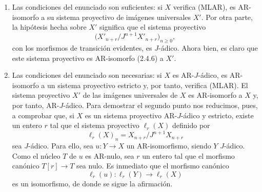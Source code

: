 \begin{prooftext}[Demostración]
\begin{enumerate}[label=(\alph*)]
\item Las condiciones del enunciado son suficientes: si $X$ verifica (MLAR), es AR-isomorfo a su sistema proyectivo de imágenes universales $X'$. Por otra parte, la hipótesis hecha sobre $X'$ significa que el sistema proyectivo
\[
\bigl(X'_{n+r}/J^{n+1}X'_{n+r}\bigr)_{n\ge0},
\]
con los morfismos de transición evidentes, es $J$-ádico. Ahora bien, es claro que este sistema proyectivo es AR-isomorfo (2.4.6) a $X'$.
\item Las condiciones del enunciado son necesarias: si $X$ es AR-$J$-ádico, es AR-isomorfo a un sistema proyectivo estricto y, por tanto, verifica (MLAR). El sistema proyectivo $X'$ de las imágenes universales de $X$ es AR-isomorfo a $X$ y, por tanto, AR-$J$-ádico. Para demostrar el segundo punto nos reducimos, pues, a comprobar que, si $X$ es un sistema proyectivo AR-$J$-ádico y estricto, existe un entero $r$ tal que el sistema proyectivo $\ell_r(X)$ definido por
\[
\ell_r(X)_n=X_{n+r}/J^{n+1}X_{n+r}
\]
sea $J$-ádico. Para ello, sea $u:Y\to X$ un AR-isomorfismo, siendo $Y$ $J$-ádico. Como el núcleo $T$ de $u$ es AR-nulo, sea $r$ un entero tal que el morfismo canónico $T[r]\to T$ sea nulo. Es inmediato que el morfismo canónico
\[
\ell_r(u):\ell_r(Y)\longrightarrow\ell_r(X)
\]
es un isomorfismo, de donde se sigue la afirmación.
\end{enumerate}
\end{prooftext}
